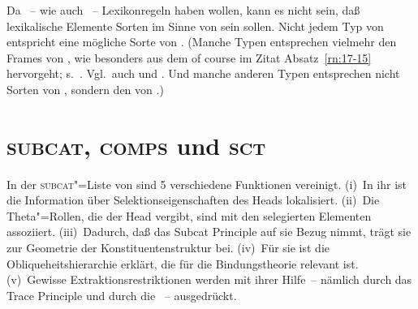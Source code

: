 \documentclass[output=paper]{LSP/langsci}
\begin{document}
\randnum\label{rn:17-21}Da \citet{PollardSag1987}~-- wie auch \citet{PollardSag1994}~-- Lexikonregeln haben wollen, kann es
nicht sein, daß lexikalische Elemente Sorten im Sinne von \citet{PollardSag1994} sein
sollen. Nicht jedem Typ von \citet{PollardSag1987} entspricht eine
mögliche Sorte von \citet{PollardSag1994}. (Manche Typen entsprechen vielmehr den Frames von \citealt{Flickingeretal1985}, wie besonders aus dem {\glqq}of course{\grqq} im Zitat
Absatz~\ref{rn:17-15} hervorgeht; s.\ \citealt{roberts1977b,roberts1977a}. Vgl.\ auch \citealt[193 Anm.~3]{PollardSag1987} und \citealt[313 Anm.~10]{sagetal1992a}. Und manche anderen Typen entsprechen nicht Sorten von \citealt{PollardSag1994}, sondern den  von \citealt{carpenteretal1991a}.)

\section{\textsc{subcat}, \textsc{comps} und \textsc{sct}}

\randnum\label{rn:17-22}In der \textsc{subcat}"=Liste von \citet[Kapitel~1--8]{PollardSag1994} sind 5
verschiedene Funktionen vereinigt. (i)~In ihr ist die Information über
Selektionseigenschaften des Heads lokalisiert. (ii)~Die Theta"=Rollen,
die der Head vergibt, sind mit den selegierten Elementen
assoziiert. (iii)~Dadurch, daß das Subcat Principle auf sie Bezug
nimmt, trägt sie zur Geometrie der Konstituentenstruktur bei. (iv)~Für
sie ist die Obliqueheitshierarchie erklärt, die für die
Bindungstheorie relevant ist. (v)~Gewisse Extraktionsrestriktionen
werden mit ihrer Hilfe~-- nämlich durch das Trace Principle und durch
die ~-- ausgedrückt.
\end{document}

